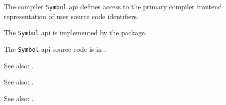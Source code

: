 
The compiler {\tt Symbol} api defines access to the primary compiler frontend 
representation of user source code identifiers.

The {\tt Symbol} api is implemented by the  package.

The {\tt Symbol} api source code is in .

See also:  .

See also:  .

See also:  .